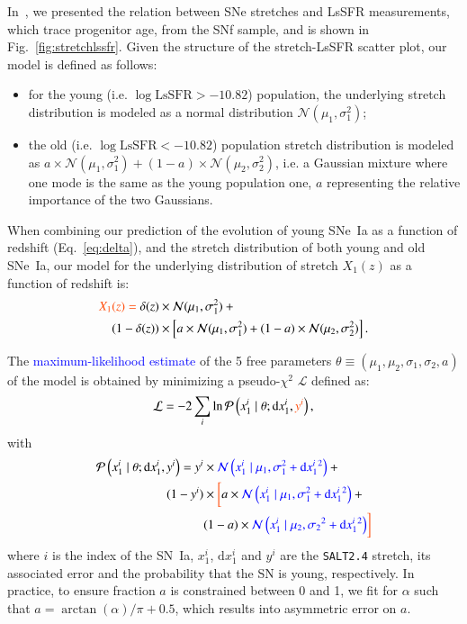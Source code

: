 \documentclass[]{aa} %
\newcommand{\nn}[1]{{\textcolor[rgb]{1, 0.27, 0}{#1}}}
\newcommand{\yc}[1]{{\textcolor{blue}{#1}}}
\newcommand{\prob}[2]{\mathcal{P}\left( #1 \mid #2\right)}
\begin{document}
\nn{In~\cite{rigault2018}, we presented the relation between SNe stretches and
LsSFR measurements, which trace progenitor age, from the SNf sample, and is
shown in Fig.~\ref{fig:stretchlssfr}}. Given the structure of the
stretch-LsSFR scatter plot, our model is defined as follows: 
\begin{itemize}
    \item for the young \nn{(i.e. $\log \mathrm{LsSFR}>-10.82$)} population, the underlying stretch distribution
    is modeled as a normal distribution $\mathcal{N}(\mu_1, \sigma_1^2)$; 
    \item the old \nn{(i.e. $\log \mathrm{LsSFR}<-10.82$)} population stretch distribution is modeled as $a\times \mathcal{N}(\mu_1, \sigma_1^2) + (1-a)\times
    \mathcal{N}(\mu_2, \sigma_2^2)$, i.e. a Gaussian mixture where one mode is the
    same as the young population one\nn{, $a$ representing the relative importance
    of the two Gaussians}.
\end{itemize}
\nn{When combining our prediction of the
evolution of young SNe~Ia as a function of redshift (Eq.~\ref{eq:delta}),
and the stretch distribution of both young and old SNe~Ia, our model for the
underlying distribution of stretch $X_1(z)$ as a function of
redshift is:}
\begin{align}
    \label{eq:stretchz}
    \nn{X_1(z) = {}}
    \delta(z) &\times \mathcal{N}(\mu_1,\sigma_1^2) + {}\nonumber\\
    (1 - \delta(z)) &\times \left[a\times\mathcal{N}(\mu_1,\sigma_1^2) +
    (1-a)\times\mathcal{N}(\mu_2,\sigma_2^2)\right].
\end{align}

The \yc{maximum-likelihood estimate} of the 5 free parameters
$\theta\equiv({\mu_1,\mu_2,\sigma_1,\sigma_2,a})$ of the model is obtained by
minimizing a pseudo-$\chi^2$ $\mathcal{L}$ defined as:
\begin{equation}
    \label{eq:likelihood}
    \mathcal{L} = -2 \sum_i \ln \prob{x^{i}_{1}}{\theta;
    \mathrm{d}x^{i}_{1}, \nn{y^i}},
\end{equation}
with
\begin{align}
    \label{eq:likelihoodsnf}
    \prob{x^{i}_{1}}{\theta; \mathrm{d}x^{i}_{1}, y^i} =
    y^i &\times \yc{\mathcal{N}\left(x^{i}_{1} \mid \mu_1, \sigma_{1}^{2}+\mathrm{d}x^{i}_{1}{}^{2}\right)} + {} \nonumber\\
        (1-y^i) &\times \nn{\bigg[} 
        a \times \yc{\mathcal{N}\left(x^{i}_{1} \mid \mu_1,
        \sigma_{1}^{2}+\mathrm{d}x^{i}_{1}{}^{2}\right)} + {} \nonumber\\
     &(1-a) \times \yc{\mathcal{N}\left(x^{i}_{1} \mid \mu_2,
     \sigma_2{}^{2}+\mathrm{d}x^{i}_{1}{}^{2}\right)} \nn{\bigg]}
\end{align}
where $i$ is the index of the SN~Ia, $x^{i}_{1}$, $\mathrm{d}x^{i}_{1}$ and
$y^i$ are the \textsc{\texttt{SALT2.4}} stretch, its associated error 
and the probability that the SN is young, respectively. 
In practice, to ensure fraction $a$ is constrained between 0 and 1,
we fit for $\alpha$ such
that $a=\arctan(\alpha)/\pi+0.5$, which results into asymmetric error on $a$.
\end{document}
